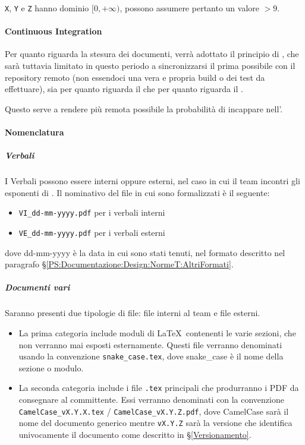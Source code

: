 			\texttt{X}, \texttt{Y} e \texttt{Z} hanno dominio $[0,+\infty)$, possono assumere pertanto un valore $> 9$.

			\paragraph{Continuous Integration}
			Per quanto riguarda la stesura dei documenti, verrà adottato il principio di , che sarà tuttavia limitato in questo periodo
			a sincronizzarsi il prima possibile con il repository remoto (non essendoci
			una vera e propria build o dei test da effettuare), sia per quanto riguarda il  che per quanto riguarda il .

			Questo serve a rendere più remota possibile la probabilità di incappare nell'.


			\paragraph{Nomenclatura}

			\subparagraph{Verbali}	\label{NomenclaturaVerbali}
			I Verbali  possono essere interni oppure esterni, nel caso in cui il team incontri gli esponenti di \II.
			Il nominativo del file in cui sono formalizzati è il seguente:
			\begin{itemize}
				\item \texttt{VI\_dd-mm-yyyy.pdf} per i verbali interni
				\item \texttt{VE\_dd-mm-yyyy.pdf} per i verbali esterni
			\end{itemize}
			dove dd-mm-yyyy è la data in cui sono stati tenuti, nel formato descritto nel paragrafo \S\ref{PS:Documentazione:Design:NormeT:AltriFormati}.

			\subparagraph{Documenti vari}
			Saranno presenti due tipologie di file: file interni al team e file esterni.
			\begin{itemize}
				\item La prima categoria include moduli di \LaTeX\ contenenti le varie sezioni, che non verranno mai esposti esternamente. Questi file verranno
					denominati usando la convenzione \texttt{snake\_case.tex}, dove snake\_case è il nome della sezione o modulo.
				\item La seconda categoria include i file \texttt{.tex} principali che produrranno i PDF da consegnare al committente. Essi verranno denominati
					con la convenzione \texttt{CamelCase\_vX.Y.X.tex} / \texttt{CamelCase\_vX.Y.Z.pdf}, dove CamelCase sarà il nome del documento generico mentre
					\texttt{vX.Y.Z} sarà la versione che identifica univocamente il documento come descritto in \S\ref{Versionamento}.
			\end{itemize}

